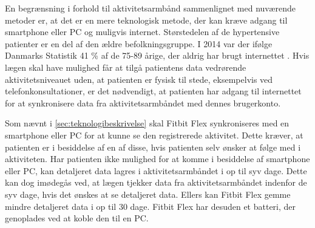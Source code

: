 En begrænsning i forhold til aktivitetsarmbånd sammenlignet med nuværende metoder er, at det er en mere teknologisk metode, der kan kræve adgang til smartphone eller PC og muligvis internet. Størstedelen af de hypertensive patienter er en del af den ældre befolkningsgruppe. I 2014 var der ifølge Danmarks Statistik 41 \% af de 75-89 årige, der aldrig har brugt internettet \citep{dst2014}. Hvis lægen skal have mulighed får at tilgå patientens data vedrørende aktivitetsniveauet uden, at patienten er fysisk til stede, eksempelvis ved telefonkonsultationer, er det nødvendigt, at patienten har adgang til internettet for at synkronisere data fra aktivitetsarmbåndet med dennes brugerkonto.

Som nævnt i \autoref{sec:teknologibeskrivelse} skal Fitbit Flex synkroniseres med en smartphone eller PC for at kunne se den registrerede aktivitet. Dette kræver, at patienten er i besiddelse af en af disse, hvis patienten selv ønsker at følge med i aktiviteten. Har patienten ikke mulighed for at komme i besiddelse af smartphone eller PC, kan detaljeret data lagres i aktivitetsarmbåndet i op til syv dage. Dette kan dog imødegås ved, at lægen tjekker data fra aktivitetsarmbåndet indenfor de syv dage, hvis det ønskes at se detaljeret data. Ellers kan Fitbit Flex gemme mindre detaljeret data i op til 30 dage. Fitbit Flex har desuden et batteri, der genoplades ved at koble den til en PC. 
